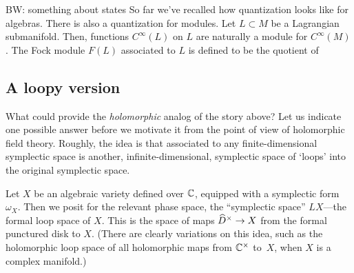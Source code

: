 \documentclass[11pt]{amsart}
\def\brian#1{{\textcolor{blue!75!red}{BW: {#1}}}}
\def\owen#1{{\textcolor{violet!50!black}{OG: {#1}}}}
\begin{document}
\brian{something about states}
So far we've recalled how quantization looks like for algebras.
There is also a quantization for modules.
Let $L \subset M$ be a Lagrangian submanifold.
Then, functions $C^\infty(L)$ on $L$ are naturally a module for $C^\infty(M)$.
The Fock module $F(L)$ associated to $L$ is defined to be the quotient of 

\subsection{A loopy version}

What could provide the {\em holomorphic} analog of the story above?
Let us indicate one possible answer before we motivate it from the point of view of holomorphic field theory.
Roughly, the idea is that associated to any finite-dimensional symplectic space is another, infinite-dimensional, symplectic space of `loops' into the original symplectic space.


Let $X$ be an algebraic variety defined over $\CC$, equipped with a symplectic form $\omega_X$.
Then we posit for the relevant phase space, the ``symplectic space'' $LX$---the formal loop space of $X$.
This is the space of maps $\Hat{D}^\times \to X$ from the formal punctured disk to $X$.
%
(There are clearly variations on this idea, such as the holomorphic loop space of all holomorphic maps from $\CC^\times$ to~$X$, when $X$ is a complex manifold.)
\end{document}
